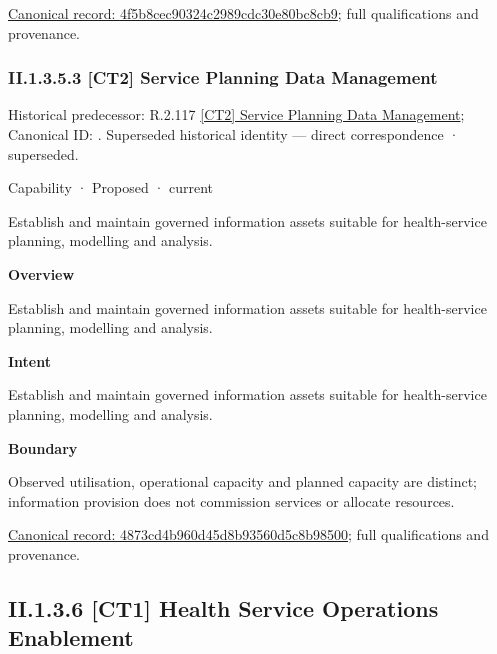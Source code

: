 {\footnotesize \href{../../../../../../../continuum/strategy/capability/4f5b8cec90324c2989cdc30e80bc8cb9.md}{Canonical record: 4f5b8cec90324c2989cdc30e80bc8cb9}; full qualifications and provenance.}\par
\subsubsection*{II.1.3.5.3 [CT2] Service Planning Data Management}
\label{navigation:II.1.3.5.3}

{\small Historical predecessor: R.2.117 \hyperref[element:19263e0802cc4b88af7a345f1410cffd]{[CT2] Service Planning Data Management}; Canonical ID: \texttt{}. Superseded historical identity — direct correspondence · superseded.}\par
\label{element:4873cd4b960d45d8b93560d5c8b98500}
{\small Capability · Proposed · current}\par

Establish and maintain governed information assets suitable for health-service planning, modelling and analysis.



\textbf{Overview}



Establish and maintain governed information assets suitable for health-service planning, modelling and analysis.



\textbf{Intent}



Establish and maintain governed information assets suitable for health-service planning, modelling and analysis.



\textbf{Boundary}



Observed utilisation, operational capacity and planned capacity are distinct; information provision does not commission services or allocate resources.


{\footnotesize \href{../../../../../../../continuum/strategy/capability/4873cd4b960d45d8b93560d5c8b98500.md}{Canonical record: 4873cd4b960d45d8b93560d5c8b98500}; full qualifications and provenance.}\par
\subsection*{II.1.3.6 [CT1] Health Service Operations Enablement}
\label{navigation:II.1.3.6}

